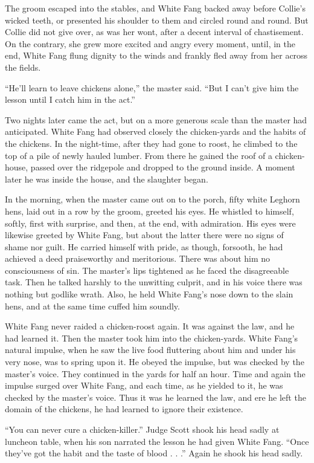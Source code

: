 \documentclass[10pt]{book}
\begin{document}
The groom escaped into the stables, and White Fang backed away before
Collie’s wicked teeth, or presented his shoulder to them and circled
round and round. But Collie did not give over, as was her wont, after a
decent interval of chastisement. On the contrary, she grew more excited
and angry every moment, until, in the end, White Fang flung dignity to
the winds and frankly fled away from her across the fields.

“He’ll learn to leave chickens alone,” the master said. “But I can’t
give him the lesson until I catch him in the act.”

Two nights later came the act, but on a more generous scale than the
master had anticipated. White Fang had observed closely the
chicken-yards and the habits of the chickens. In the night-time, after
they had gone to roost, he climbed to the top of a pile of newly hauled
lumber. From there he gained the roof of a chicken-house, passed over
the ridgepole and dropped to the ground inside. A moment later he was
inside the house, and the slaughter began.

In the morning, when the master came out on to the porch, fifty white
Leghorn hens, laid out in a row by the groom, greeted his eyes. He
whistled to himself, softly, first with surprise, and then, at the end,
with admiration. His eyes were likewise greeted by White Fang, but
about the latter there were no signs of shame nor guilt. He carried
himself with pride, as though, forsooth, he had achieved a deed
praiseworthy and meritorious. There was about him no consciousness of
sin. The master’s lips tightened as he faced the disagreeable task.
Then he talked harshly to the unwitting culprit, and in his voice there
was nothing but godlike wrath. Also, he held White Fang’s nose down to
the slain hens, and at the same time cuffed him soundly.

White Fang never raided a chicken-roost again. It was against the law,
and he had learned it. Then the master took him into the chicken-yards.
White Fang’s natural impulse, when he saw the live food fluttering
about him and under his very nose, was to spring upon it. He obeyed the
impulse, but was checked by the master’s voice. They continued in the
yards for half an hour. Time and again the impulse surged over White
Fang, and each time, as he yielded to it, he was checked by the
master’s voice. Thus it was he learned the law, and ere he left the
domain of the chickens, he had learned to ignore their existence.

“You can never cure a chicken-killer.” Judge Scott shook his head sadly
at luncheon table, when his son narrated the lesson he had given White
Fang. “Once they’ve got the habit and the taste of blood . . .” Again
he shook his head sadly.
\end{document}
